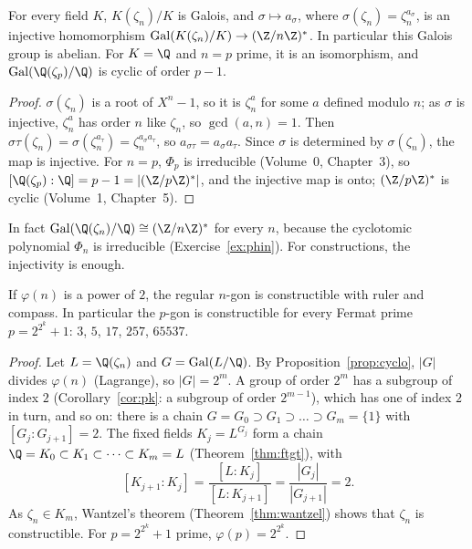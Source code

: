 \begin{proposition}\label{prop:cyclo}
For every field $K$, $K(\zeta_n)/K$ is Galois, and $\sigma\mapsto a_\sigma$, where $\sigma(\zeta_n)=\zeta_n^{a_\sigma}$, is an injective homomorphism $\operatorname{Gal}(K(\zeta_n)/K)\to(\Z/n\Z)^*$. In particular this Galois group is abelian. For $K=\Q$ and $n=p$ prime, it is an isomorphism, and $\operatorname{Gal}(\Q(\zeta_p)/\Q)$ is cyclic of order $p-1$.
\end{proposition}
\begin{proof}
$\sigma(\zeta_n)$ is a root of $X^n-1$, so it is $\zeta_n^a$ for some $a$ defined modulo $n$; as $\sigma$ is injective, $\zeta_n^a$ has order $n$ like $\zeta_n$, so $\gcd(a,n)=1$. Then $\sigma\tau(\zeta_n)=\sigma(\zeta_n^{a_\tau})=\zeta_n^{a_\sigma a_\tau}$, so $a_{\sigma\tau}=a_\sigma a_\tau$. Since $\sigma$ is determined by $\sigma(\zeta_n)$, the map is injective. For $n=p$, $\Phi_p$ is irreducible (Volume~0, Chapter~3), so $[\Q(\zeta_p):\Q]=p-1=|(\Z/p\Z)^*|$, and the injective map is onto; $(\Z/p\Z)^*$ is cyclic (Volume~1, Chapter~5).
\end{proof}

In fact $\operatorname{Gal}(\Q(\zeta_n)/\Q)\cong(\Z/n\Z)^*$ for every $n$, because the cyclotomic polynomial $\Phi_n$ is irreducible (Exercise~\ref{ex:phin}). For constructions, the injectivity is enough.

\begin{theorem}\label{thm:gw}
If $\varphi(n)$ is a power of $2$, the regular $n$-gon is constructible with ruler and compass. In particular the $p$-gon is constructible for every Fermat prime $p=2^{2^k}+1$: $3$, $5$, $17$, $257$, $65537$.
\end{theorem}
\begin{proof}
Let $L=\Q(\zeta_n)$ and $G=\operatorname{Gal}(L/\Q)$. By Proposition~\ref{prop:cyclo}, $|G|$ divides $\varphi(n)$ (Lagrange), so $|G|=2^m$. A group of order $2^m$ has a subgroup of index $2$ (Corollary~\ref{cor:pk}: a subgroup of order $2^{m-1}$), which has one of index $2$ in turn, and so on: there is a chain $G=G_0\supset G_1\supset\dots\supset G_m=\{1\}$ with $[G_{j}:G_{j+1}]=2$. The fixed fields $K_j=L^{G_j}$ form a chain $\Q=K_0\subset K_1\subset\dots\subset K_m=L$ (Theorem~\ref{thm:ftgt}), with
\[
[K_{j+1}:K_j]=\frac{[L:K_j]}{[L:K_{j+1}]}=\frac{|G_j|}{|G_{j+1}|}=2.
\]
As $\zeta_n\in K_m$, Wantzel's theorem (Theorem~\ref{thm:wantzel}) shows that $\zeta_n$ is constructible. For $p=2^{2^k}+1$ prime, $\varphi(p)=2^{2^k}$.
\end{proof}

